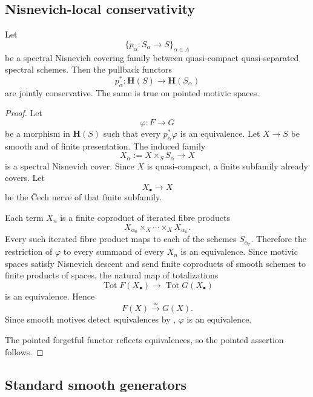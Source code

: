 \subsection{Nisnevich-local conservativity}

\begin{proposition}
\label{prop:nisnevich-local-conservativity}
Let
\[
    \{p_\alpha:S_\alpha\to S\}_{\alpha\in A}
\]
be a spectral Nisnevich covering family between quasi-compact
quasi-separated spectral schemes.  Then the pullback functors
\[
    p_\alpha^*
    \colon
    \mathbf H(S)
    \longrightarrow
    \mathbf H(S_\alpha)
\]
are jointly conservative.  The same is true on pointed motivic spaces.
\end{proposition}

\begin{proof}
Let
\[
    \varphi
    \colon
    F
    \longrightarrow
    G
\]
be a morphism in \(\mathbf H(S)\) such that every
\(p_\alpha^*\varphi\) is an equivalence.  Let
\(X\to S\) be smooth and of finite presentation.  The induced family
\[
    X_\alpha
    :=
    X\times_SS_\alpha
    \longrightarrow
    X
\]
is a spectral Nisnevich cover.  Since \(X\) is quasi-compact, a finite
subfamily already covers.  Let
\[
    X_\bullet
    \longrightarrow
    X
\]
be the Čech nerve of that finite subfamily.

Each term \(X_n\) is a finite coproduct of iterated fibre products
\[
    X_{\alpha_0}
    \times_X
    \cdots
    \times_X
    X_{\alpha_n}.
\]
Every such iterated fibre product maps to each of the schemes
\(S_{\alpha_r}\).  Therefore the restriction of \(\varphi\) to every
summand of every \(X_n\) is an equivalence.  Since motivic spaces satisfy
Nisnevich descent and send finite coproducts of smooth schemes to finite
products of spaces, the natural map of totalizations
\[
    \operatorname{Tot}F(X_\bullet)
    \longrightarrow
    \operatorname{Tot}G(X_\bullet)
\]
is an equivalence.  Hence
\[
    F(X)
    \xrightarrow{\simeq}
    G(X).
\]
Since smooth motives detect equivalences by
,
\(\varphi\) is an equivalence.

The pointed forgetful functor reflects equivalences, so the pointed
assertion follows.
\end{proof}

\subsection{Standard smooth generators}

